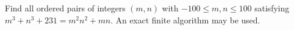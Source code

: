 Find all ordered pairs of integers $(m,n)$ with $-100\le m,n\le100$ satisfying $m^3+n^3+231=m^2n^2+mn$. An exact finite algorithm may be used.
